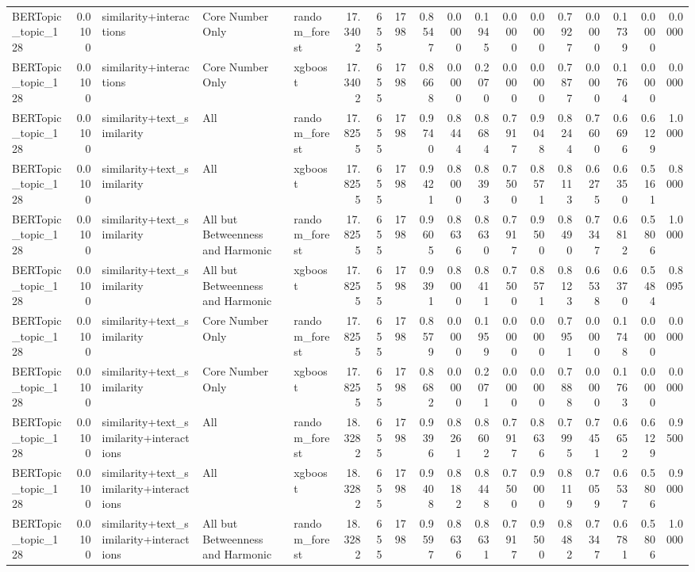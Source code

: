 \begin{tabular}{lrlllrrrrrrrrrrrrr}
BERTopic_topic_128 & 0.0100 & similarity+interactions & Core Number Only & random_forest & 17.3402 & 655 & 1798 & 0.8547 & 0.0000 & 0.1945 & 0.0000 & 0.0000 & 0.7927 & 0.0000 & 0.1739 & 0.0000 & 0.0000 \\
BERTopic_topic_128 & 0.0100 & similarity+interactions & Core Number Only & xgboost & 17.3402 & 655 & 1798 & 0.8668 & 0.0000 & 0.2070 & 0.0000 & 0.0000 & 0.7877 & 0.0000 & 0.1764 & 0.0000 & 0.0000 \\
BERTopic_topic_128 & 0.0100 & similarity+text_similarity & All & random_forest & 17.8255 & 655 & 1798 & 0.9740 & 0.8444 & 0.8684 & 0.7917 & 0.9048 & 0.8244 & 0.7600 & 0.6696 & 0.6129 & 1.0000 \\
BERTopic_topic_128 & 0.0100 & similarity+text_similarity & All & xgboost & 17.8255 & 655 & 1798 & 0.9421 & 0.8000 & 0.8393 & 0.7500 & 0.8571 & 0.8113 & 0.6275 & 0.6350 & 0.5161 & 0.8000 \\
BERTopic_topic_128 & 0.0100 & similarity+text_similarity & All but Betweenness and Harmonic & random_forest & 17.8255 & 655 & 1798 & 0.9605 & 0.8636 & 0.8630 & 0.7917 & 0.9500 & 0.8490 & 0.7347 & 0.6812 & 0.5806 & 1.0000 \\
BERTopic_topic_128 & 0.0100 & similarity+text_similarity & All but Betweenness and Harmonic & xgboost & 17.8255 & 655 & 1798 & 0.9391 & 0.8000 & 0.8411 & 0.7500 & 0.8571 & 0.8123 & 0.6538 & 0.6370 & 0.5484 & 0.8095 \\
BERTopic_topic_128 & 0.0100 & similarity+text_similarity & Core Number Only & random_forest & 17.8255 & 655 & 1798 & 0.8579 & 0.0000 & 0.1959 & 0.0000 & 0.0000 & 0.7951 & 0.0000 & 0.1748 & 0.0000 & 0.0000 \\
BERTopic_topic_128 & 0.0100 & similarity+text_similarity & Core Number Only & xgboost & 17.8255 & 655 & 1798 & 0.8682 & 0.0000 & 0.2071 & 0.0000 & 0.0000 & 0.7888 & 0.0000 & 0.1763 & 0.0000 & 0.0000 \\
BERTopic_topic_128 & 0.0100 & similarity+text_similarity+interactions & All & random_forest & 18.3282 & 655 & 1798 & 0.9396 & 0.8261 & 0.8602 & 0.7917 & 0.8636 & 0.7995 & 0.7451 & 0.6652 & 0.6129 & 0.9500 \\
BERTopic_topic_128 & 0.0100 & similarity+text_similarity+interactions & All & xgboost & 18.3282 & 655 & 1798 & 0.9408 & 0.8182 & 0.8448 & 0.7500 & 0.9000 & 0.8119 & 0.7059 & 0.6537 & 0.5806 & 0.9000 \\
BERTopic_topic_128 & 0.0100 & similarity+text_similarity+interactions & All but Betweenness and Harmonic & random_forest & 18.3282 & 655 & 1798 & 0.9597 & 0.8636 & 0.8631 & 0.7917 & 0.9500 & 0.8482 & 0.7347 & 0.6781 & 0.5806 & 1.0000 \\

\end{tabular}
